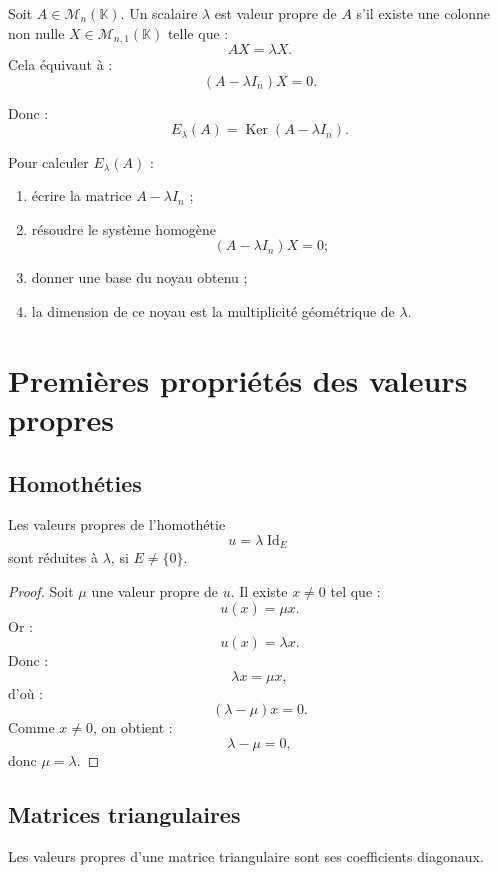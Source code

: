 \documentclass[11pt,a4paper]{article}
\newcommand{\K}{\mathbb K}
\newcommand{\M}{\mathcal M}
\newcommand{\Ker}{\operatorname{Ker}}
\newcommand{\Id}{\operatorname{Id}}
\begin{document}
Soit \(A\in\M_n(\K)\).  
Un scalaire \(\lambda\) est valeur propre de \(A\) s'il existe une colonne non nulle \(X\in\M_{n,1}(\K)\) telle que :
\[
AX=\lambda X.
\]
Cela équivaut à :
\[
(A-\lambda I_n)X=0.
\]

Donc :
\[
E_\lambda(A)=\Ker(A-\lambda I_n).
\]

\begin{methodbox}
Pour calculer \(E_\lambda(A)\) :
\begin{enumerate}
    \item écrire la matrice \(A-\lambda I_n\) ;
    \item résoudre le système homogène
    \[
    (A-\lambda I_n)X=0 ;
    \]
    \item donner une base du noyau obtenu ;
    \item la dimension de ce noyau est la multiplicité géométrique de \(\lambda\).
\end{enumerate}
\end{methodbox}

\section{Premières propriétés des valeurs propres}

\subsection{Homothéties}

\begin{theorembox}
Les valeurs propres de l'homothétie
\[
u=\lambda\Id_E
\]
sont réduites à \(\lambda\), si \(E\neq\{0\}\).
\end{theorembox}

\begin{proof}
Soit \(\mu\) une valeur propre de \(u\).  
Il existe \(x\neq0\) tel que :
\[
u(x)=\mu x.
\]
Or :
\[
u(x)=\lambda x.
\]
Donc :
\[
\lambda x=\mu x,
\]
d'où :
\[
(\lambda-\mu)x=0.
\]
Comme \(x\neq0\), on obtient :
\[
\lambda-\mu=0,
\]
donc \(\mu=\lambda\).
\end{proof}

\subsection{Matrices triangulaires}

\begin{theorembox}
Les valeurs propres d'une matrice triangulaire sont ses coefficients diagonaux.
\end{theorembox}
\end{document}
